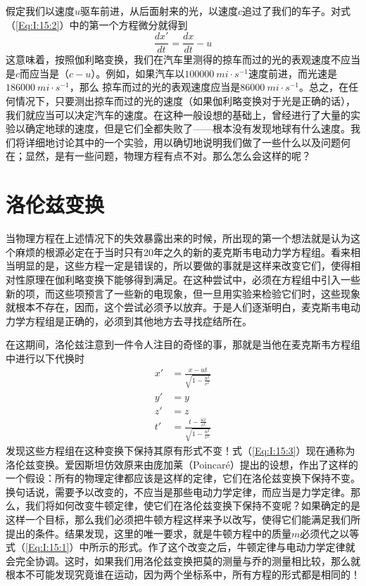 假定我们以速度$u$驱车前进，从后面射来的光，以速度$c$追过了我们的车子。对式（\ref{Eq:I:15:2}）中的第一个方程微分就得到
\begin{equation*}
    \frac{dx'}{dt}=\frac{dx}{dt} - u
\end{equation*}
这意味着，按照伽利略变换，我们在汽车里测得的掠车而过的光的表观速度不应当是$c$而应当是（$c-u$）。例如，如果汽车以$100000~mi \cdot s^{-1}$速度前进，而光速是$186000~mi \cdot s^{-1}$，那么
掠车而过的光的表观速度应当是$86000~mi \cdot s^{-1}$。总之，在任何情况下，只要测出掠车而过的光的速度（如果伽利略变换对于光是正确的话），我们就应当可以决定汽车的速度。在这种一般设想的基础上，曾经进行了大量的实验以确定地球的速度，但是它们全都失败了——根本没有发现地球有什么速度。我们将详细地讨论其中的一个实验，用以确切地说明我们做了一些什么以及问题何在；显然，是有一些问题，物理方程有点不对。那么怎么会这样的呢？

\section{洛伦兹变换}

当物理方程在上述情况下的失效暴露出来的时候，所出现的第一个想法就是认为这个麻烦的根源必定在于当时只有20年之久的新的麦克斯韦电动力学方程组。看来相当明显的是，这些方程一定是错误的，所以要做的事就是这样来改变它们，使得相对性原理在伽利略变换下能够得到满足。在这种尝试中，必须在方程组中引入一些新的项，而这些项预言了一些新的电现象，但一旦用实验来检验它们时，这些现象就根本不存在，因而，这个尝试必须予以放弃。于是人们逐渐明白，麦克斯韦电动力学方程组是正确的，必须到其他地方去寻找症结所在。

在这期间，洛伦兹注意到一件令人注目的奇怪的事，那就是当他在麦克斯韦方程组中进行以下代换时
\begin{equation}
    \label{Eq:I:15:3}
    \begin{aligned}
        x'&=\frac{x-ut}{\sqrt{1-\frac{u^2}{c^2}}} \\
        y'&=y \\
        z'&=z \\
        t'&=\frac{t-\frac{ux}{c^2}}{\sqrt{1-\frac{u^2}{c^2}}}
    \end{aligned}
\end{equation}
发现这些方程组在这种变换下保持其原有形式不变！式（\ref{Eq:I:15:3}）现在通称为洛伦兹变换。爱因斯坦仿效原来由庞加莱（Poincaré）提出的设想，作出了这样的一个假设：所有的物理定律都应该是这样的定律，它们在洛伦兹变换下保持不变。换句话说，需要予以改变的，不应当是那些电动力学定律，而应当是力学定律。那么，我们将如何改变牛顿定律，使它们在洛伦兹变换下保持不变呢？如果确定的是这样一个目标，那么我们必须把牛顿方程这样来予以改写，使得它们能满足我们所提出的条件。结果发现，这里的唯一要求，就是牛顿方程中的质量$m$必须代之以等式（\ref{Eq:I:15:1}）中所示的形式。作了这个改变之后，牛顿定律与电动力学定律就会完全协调。这时，如果我们用洛伦兹变换把莫的测量与乔的测量相比较，那么就根本不可能发现究竟谁在运动，因为两个坐标系中，所有方程的形式都是相同的！

